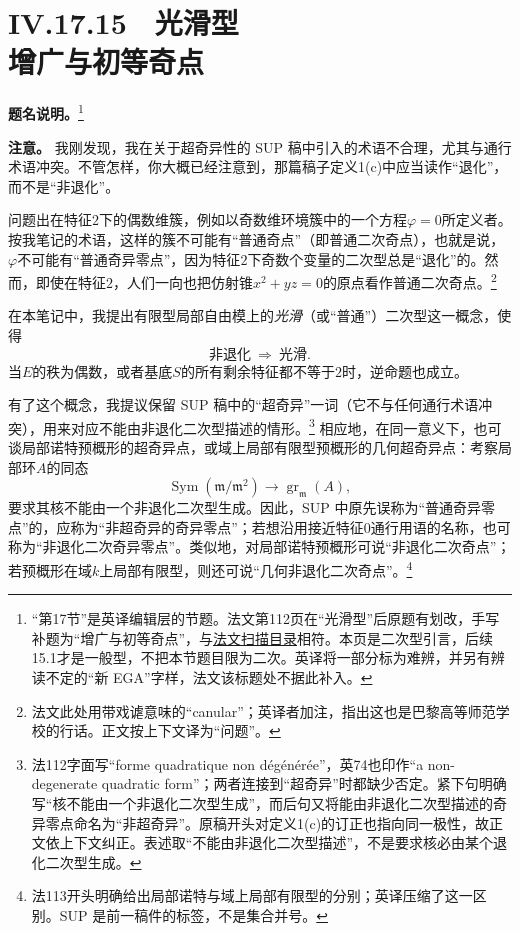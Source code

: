 \chapter*{IV.17.15　光滑型\protect\\增广与初等奇点}
\begingroup
\def\OO{\mathcal O}\def\m{\mathfrak m}\def\mm{\mathfrak m}\def\Sym{\operatorname{Sym}}
\noindent\textbf{题名说明。}\footnote{“第17节”是英译编辑层的节题。法文第112页在“光滑型”后原题有划改，手写补题为“增广与初等奇点”，与\href{https://webusers.imj-prg.fr/~leila.schneps/grothendieckcircle/EGA/EGAVcontents.pdf}{法文扫描目录}相符。本页是二次型引言，后续15.1才是一般型，不把本节题目限为二次。英译将一部分标为难辨，并另有辨读不定的“新 EGA”字样，法文该标题处不据此补入。}

\medskip
\noindent\textbf{注意。} 我刚发现，我在关于超奇异性的 SUP 稿中引入的术语不合理，尤其与通行术语冲突。不管怎样，你大概已经注意到，那篇稿子定义1(c)中应当读作“退化”，而不是“非退化”。

问题出在特征$2$下的偶数维簇，例如以奇数维环境簇中的一个方程$\varphi=0$所定义者。按我笔记的术语，这样的簇不可能有“普通奇点”（即普通二次奇点），也就是说，$\varphi$不可能有“普通奇异零点”，因为特征$2$下奇数个变量的二次型总是“退化”的。然而，即使在特征$2$，人们一向也把仿射锥$x^2+yz=0$的原点看作普通二次奇点。\footnote{法文此处用带戏谑意味的“canular”；英译者加注，指出这也是巴黎高等师范学校的行话。正文按上下文译为“问题”。}

在本笔记中，我提出有限型局部自由模上的\emph{光滑}（或“普通”）二次型这一概念，使得
\[
\text{非退化}\ \Longrightarrow\ \text{光滑}.
\]
当$E$的秩为偶数，或者基底$S$的所有剩余特征都不等于$2$时，逆命题也成立。

有了这个概念，我提议保留 SUP 稿中的“超奇异”一词（它不与任何通行术语冲突），用来对应不能由非退化二次型描述的情形。\footnote{法112字面写“forme quadratique non dégénérée”，英74也印作“a non-degenerate quadratic form”；两者连接到“超奇异”时都缺少否定。紧下句明确写“核不能由一个非退化二次型生成”，而后句又将能由非退化二次型描述的奇异零点命名为“非超奇异”。原稿开头对定义1(c)的订正也指向同一极性，故正文依上下文纠正。表述取“不能由非退化二次型描述”，不是要求核必由某个退化二次型生成。}
相应地，在同一意义下，也可谈局部诺特预概形的超奇异点，或域上局部有限型预概形的几何超奇异点：考察局部环$A$的同态
\[
\operatorname{Sym}(\mm/\mm^2)\longrightarrow
\operatorname{gr}_{\mm}(A),
\]
要求其核不能由一个非退化二次型生成。因此，SUP 中原先误称为“普通奇异零点”的，应称为“非超奇异的奇异零点”；若想沿用接近特征$0$通行用语的名称，也可称为“非退化二次奇异零点”。类似地，对局部诺特预概形可说“非退化二次奇点”；若预概形在域$k$上局部有限型，则还可说“几何非退化二次奇点”。\footnote{法113开头明确给出局部诺特与域上局部有限型的分别；英译压缩了这一区别。SUP 是前一稿件的标签，不是集合并号。}

